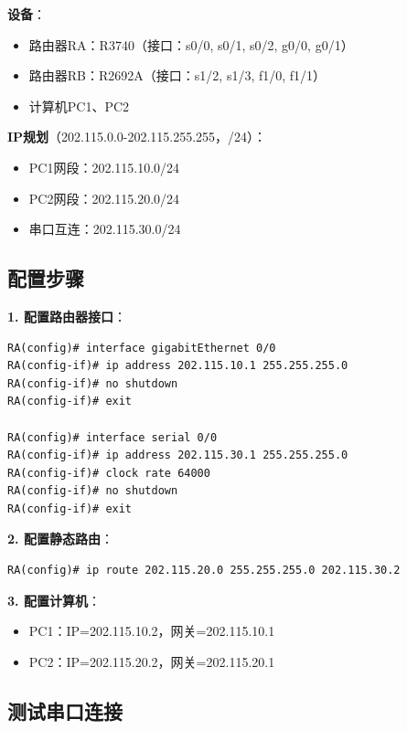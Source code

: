 \documentclass[12pt,a4paper]{ctexart}
\begin{document}
\begin{exambox}[典型实验拓扑]
\textbf{设备}：
\begin{itemize}[itemsep=0pt]
    \item 路由器RA：R3740（接口：s0/0, s0/1, s0/2, g0/0, g0/1）
    \item 路由器RB：R2692A（接口：s1/2, s1/3, f1/0, f1/1）
    \item 计算机PC1、PC2
\end{itemize}

\textbf{IP规划}（202.115.0.0-202.115.255.255，/24）：
\begin{itemize}[itemsep=0pt]
    \item PC1网段：202.115.10.0/24
    \item PC2网段：202.115.20.0/24
    \item 串口互连：202.115.30.0/24
\end{itemize}
\end{exambox}

\subsection{配置步骤}

\begin{cmdbox}
\textbf{1. 配置路由器接口}：
\begin{lstlisting}
RA(config)# interface gigabitEthernet 0/0
RA(config-if)# ip address 202.115.10.1 255.255.255.0
RA(config-if)# no shutdown
RA(config-if)# exit

RA(config)# interface serial 0/0
RA(config-if)# ip address 202.115.30.1 255.255.255.0
RA(config-if)# clock rate 64000
RA(config-if)# no shutdown
RA(config-if)# exit
\end{lstlisting}

\textbf{2. 配置静态路由}：
\begin{lstlisting}
RA(config)# ip route 202.115.20.0 255.255.255.0 202.115.30.2
\end{lstlisting}

\textbf{3. 配置计算机}：
\begin{itemize}[itemsep=0pt]
    \item PC1：IP=202.115.10.2，网关=202.115.10.1
    \item PC2：IP=202.115.20.2，网关=202.115.20.1
\end{itemize}
\end{cmdbox}

\subsection{测试串口连接}
\end{document}
